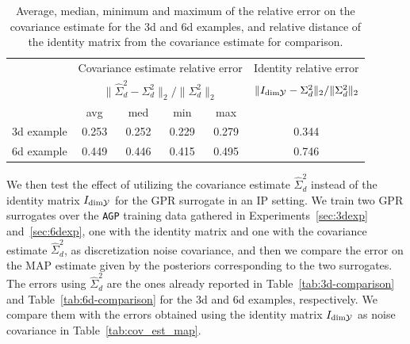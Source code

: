 \begin{table}[H]

    \begin{centering}
        
    
    \hspace*{-1.5cm}
    \begin{tabular}{cccccc}
    \toprule
        & \multicolumn{4}{c}{Covariance estimate relative error}  & Identity relative error \\ 
        & \multicolumn{4}{c}{$ \|\hat \Sigma_d^2 - \Sigma_d^2\|_2 / \|\Sigma_d^2\|_2 $}  & $ \|I_{\text{dim} \mathcal Y} - \Sigma_d^2\|_2 / \|\Sigma_d^2\|_2 $ \\ 
        & avg   & med   & min   & max   &  \\
        \midrule
        3d example
        & 0.253 & 0.252 & 0.229 & 0.279
        & 0.344 \\
        6d example
        & 0.449 & 0.446 & 0.415 & 0.495 
        & 0.746 \\
        
    \bottomrule
    \end{tabular}
    \caption{Average, median, minimum and maximum of the relative error on the covariance estimate for the 3d and 6d examples, and relative distance of the identity matrix from the covariance estimate for comparison.
    }
    \label{tab:cov_est_err}
\end{centering}
\end{table}

We then test the effect of utilizing the covariance estimate $\hat \Sigma_d^2$ instead of the identity matrix $I_{\text{dim} \mathcal Y}$ for the GPR surrogate in an IP setting.
We train two GPR surrogates over the \texttt{AGP} training data gathered in Experiments~\ref{sec:3dexp} and~\ref{sec:6dexp}, one with the identity matrix and one with the covariance estimate $\hat \Sigma_d^2$, as discretization noise covariance, and then we compare the error on the MAP estimate given by the posteriors corresponding to the two surrogates.
The errors using $\hat \Sigma_d^2$ are the ones already reported in Table~\ref{tab:3d-comparison} and Table~\ref{tab:6d-comparison} for the 3d and 6d examples, respectively.
We compare them with the errors obtained using the identity matrix $I_{\text{dim} \mathcal Y } $ as noise covariance in Table~\ref{tab:cov_est_map}.

